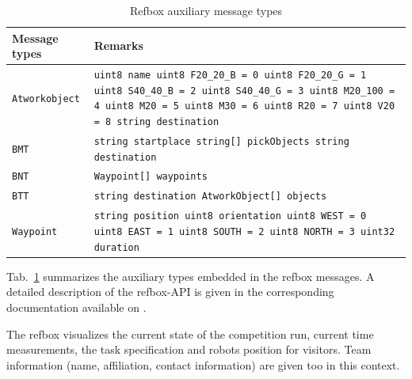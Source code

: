 \begin{table}[h!]
\centering
 \begin{tabular}{|l|p{6.3cm}|}
 \hline
 Message types & Remarks \\ \hline\hline
 {\tt Atworkobject} & {\tt uint8 name\newline
uint8 F20\_20\_B = 0 \newline
uint8 F20\_20\_G = 1 \newline
uint8 S40\_40\_B = 2 \newline
uint8 S40\_40\_G = 3 \newline
uint8 M20\_100  = 4 \newline
uint8 M20      = 5 \newline
uint8 M30      = 6 \newline
uint8 R20      = 7 \newline
uint8 V20      = 8 \newline
string destination }\\ \hline
 {\tt BMT} &  {\tt string   startplace \newline
string[] pickObjects \newline
string   destination }\\ \hline
 {\tt BNT} &  {\tt Waypoint[] waypoints }\\ \hline
  {\tt BTT} &  {\tt string destination  \newline
AtworkObject[] objects }\\ \hline
   {\tt Waypoint  } &  {\tt string position \newline
uint8  orientation \newline
uint8  WEST  = 0 \newline
uint8  EAST  = 1 \newline
uint8  SOUTH = 2 \newline
uint8  NORTH = 3 \newline
uint32  duration  }\\\hline
 \end{tabular}
 \caption{Refbox auxiliary message types }
  \label{tab:RefBoxAUX}
\end{table}

Tab.~\ref{tab:RefBoxAUX} summarizes the auxiliary types embedded in
the refbox messages. A detailed description of the refbox-API is given in the 
corresponding documentation available on . 

\par
The refbox visualizes the current state of the competition run, current time measurements, the task specification and robots position for visitors. Team information (name, affiliation, contact information) are given too in this context.

